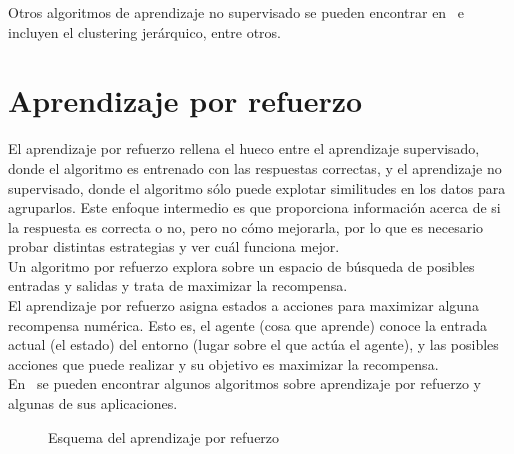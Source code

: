 \endgroup


Otros algoritmos de aprendizaje no supervisado se pueden encontrar en~\cite{hinton1999unsupervised} e incluyen el clustering jerárquico, entre otros.

\section{Aprendizaje por refuerzo}
El aprendizaje por refuerzo rellena el hueco entre el aprendizaje supervisado, donde el algoritmo es entrenado con las respuestas correctas, y el aprendizaje no supervisado, donde el algoritmo sólo puede explotar similitudes en los datos para agruparlos. Este enfoque intermedio es que proporciona información acerca de si la respuesta es correcta o no, pero no cómo mejorarla, por lo que es necesario probar distintas estrategias y ver cuál funciona mejor.\\

Un algoritmo por refuerzo explora sobre un espacio de búsqueda de posibles entradas y salidas y trata de maximizar la recompensa.\\

El aprendizaje por refuerzo asigna estados a acciones para maximizar alguna recompensa numérica. Esto es, el agente (cosa que aprende) conoce la entrada actual (el estado) del entorno (lugar sobre el que actúa el agente), y las posibles acciones que puede realizar y su objetivo es maximizar la recompensa.\\

En~\cite{Sutton:1998:IRL:551283, Marsland:2009:MLA:1571643} se pueden encontrar algunos algoritmos sobre aprendizaje por refuerzo y algunas de sus aplicaciones.\\


\begin{figure}[htbp!]
	\label{fig:aprendizajerefuerzo}
	\begin{center}
		\resizebox{7cm}{!}{%
			\aprendizajerefuerzo
		}
	\end{center}
	\caption{Esquema del aprendizaje por refuerzo}
\end{figure}
